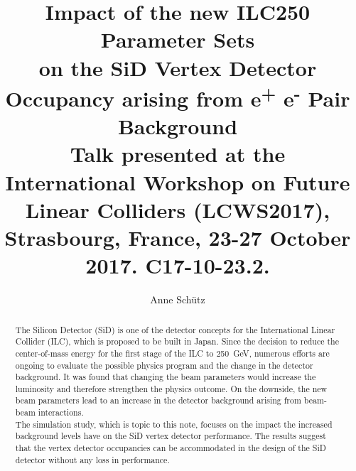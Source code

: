 \documentclass[12pt]{article}
\newcommand{\sid}{SiD\xspace}
\newcommand{\electron}{e\textsuperscript{-}\xspace}
\newcommand{\positron}{e\textsuperscript{+}\xspace}
\begin{document}

\title{Impact of the new ILC250 Parameter Sets\\on the \sid Vertex Detector Occupancy arising from \positron\electron Pair Background\vspace*{0.3cm}\\{\normalsize Talk presented at the\\\large International Workshop on Future Linear Colliders (LCWS2017), Strasbourg, France, 23-27 October 2017. C17-10-23.2.}}

\author[1,2]{Anne Sch\"utz}


\maketitle


\begin{abstract}
The Silicon Detector (SiD) is one of the detector concepts for the International Linear Collider (ILC), which is proposed to be built in Japan.
Since the decision to reduce the center-of-mass energy for the first stage of the ILC to \SI{250}{\GeV}, numerous efforts are ongoing to evaluate the possible physics program and the change in the detector background.
It was found that changing the beam parameters would increase the luminosity and therefore strengthen the physics outcome.
On the downside, the new beam parameters lead to an increase in the detector background arising from beam-beam interactions.
\\
The simulation study, which is topic to this note, focuses on the impact the increased background levels have on the SiD vertex detector performance.
The results suggest that the vertex detector occupancies can be accommodated in the design of the SiD detector without any loss in performance.
\end{abstract}


\end{document}
